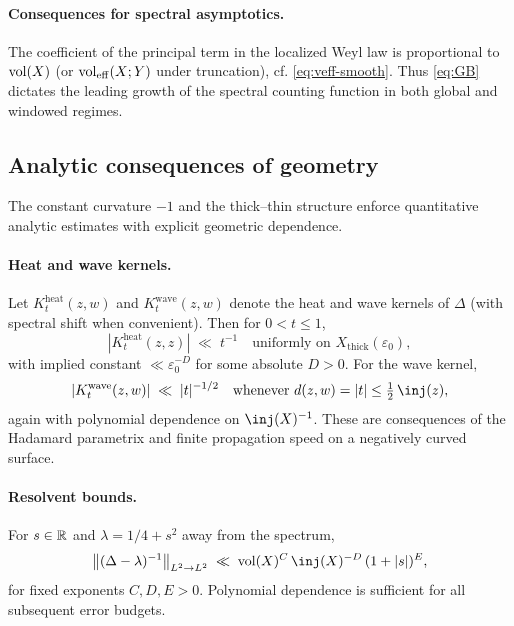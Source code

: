 \paragraph{Consequences for spectral asymptotics.}
The coefficient of the principal term in the localized Weyl law is proportional to $\operatorname{vol}(X)$ (or $\operatorname{vol}_{\mathrm{eff}}(X;Y)$ under truncation), cf. \eqref{eq:veff-smooth}. Thus \eqref{eq:GB} dictates the leading growth of the spectral counting function in both global and windowed regimes.

\medskip

\subsection{Analytic consequences of geometry}\label{subsec:geometry-analytic}

The constant curvature $-1$ and the thick--thin structure enforce quantitative analytic estimates with explicit geometric dependence.

\paragraph{Heat and wave kernels.}
Let $K_t^{\mathrm{heat}}(z,w)$ and $K_t^{\mathrm{wave}}(z,w)$ denote the heat and wave kernels of $\Delta$ (with spectral shift when convenient). Then for $0<t\le 1$,
\begin{equation}\label{eq:heat-smalltime}
  |K_t^{\mathrm{heat}}(z,z)| \;\ll\; t^{-1} \quad\text{uniformly on } X_{\mathrm{thick}}(\varepsilon_0),
\end{equation}
with implied constant $\ll \varepsilon_0^{-D}$ for some absolute $D>0$. For the wave kernel,
\begin{equation}\label{eq:wave-smalltime}
  |K_t^{\mathrm{wave}}(z,w)| \;\ll\; |t|^{-1/2} \quad\text{whenever } d(z,w)=|t|\le \tfrac12\,\inj(z),
\end{equation}
again with polynomial dependence on $\inj(X)^{-1}$. These are consequences of the Hadamard parametrix and finite propagation speed on a negatively curved surface.

\paragraph{Resolvent bounds.}
For $s\in\mathbb{R}$ and $\lambda=1/4+s^2$ away from the spectrum,
\begin{equation}\label{eq:resolvent}
  \big\|(\Delta-\lambda)^{-1}\big\|_{L^2\to L^2} \;\ll\; \vol(X)^C\,\inj(X)^{-D}\,(1+|s|)^E,
\end{equation}
for fixed exponents $C,D,E>0$. Polynomial dependence is sufficient for all subsequent error budgets.

